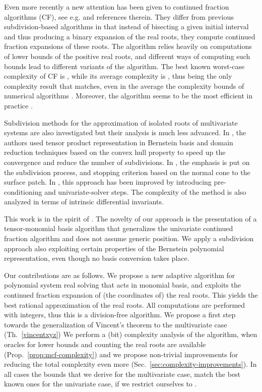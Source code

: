 \documentclass{sig-alternate}
\begin{document}
Even more recently a new attention has been given to continued
fraction algorithms (CF), see
e.g. \cite{sharma-tcs-2008,et-tcs-2007} and references
therein. They differ from previous subdivision-based algorithms in
that instead of bisecting a given initial interval and thus producing
a binary expansion of the real roots, they compute continued fraction
expansions of these roots. The algorithm relies heavily on
computations of lower bounds of the positive real roots, and different
ways of computing such bounds lead to different variants of the
algorithm.  The best known worst-case complexity of CF is  \cite{sharma-tcs-2008}, while its average complexity is
, thus being the only complexity result that matches,
even in the average the complexity bounds of numerical algorithms
\cite{Pan02jsc}.  Moreover, the algorithm seems to be the most
efficient in practice \cite{ACS-TR-363602-02,et-tcs-2007}.


Subdivision methods for the approximation of isolated roots of
multivariate systems are also investigated but their analysis is much
less advanced.  In \cite{sp-csnps-93}, the authors used tensor product
representation in Bernstein basis and domain reduction techniques
based on the convex hull property to speed up the convergence and
reduce the number of subdivisions. In \cite{ELBER:2001}, the emphasis
is put on the subdivision process, and stopping criterion based on the
normal cone to the surface patch.  In \cite{mp:smspe-05}, this
approach has been improved by introducing pre-conditioning and
univariate-solver steps. The complexity of the method is also analyzed
in terms of intrinsic differential invariants.

This work is in the spirit of \cite{mp:smspe-05}.  The novelty of our
approach is the presentation of a tensor-monomial basis algorithm that
generalizes the univariate continued fraction algorithm and does not
assume generic position. We apply a subdivision approach also
exploiting certain properties of the Bernstein polynomial
representation, even though no basis conversion takes place.



Our contributions are as follows.
We propose a new adaptive algorithm for polynomial system real solving
that acts in monomial basis, and exploits the continued fraction
expansion of (the coordinates of) the real roots.  This yields the
best rational approximation of the real roots.  All computations are
performed with integers, thus this is a division-free algorithm.
We propose a first step towards the generalization of Vincent's
theorem to the multivariate case (Th.~\ref{vincentxyz})
We perform a (bit) complexity analysis of the algorithm, when oracles
for lower bounds and counting the real roots are available
(Prop.~\ref{prop:mcf-complexity}) and we propose non-trivial
improvements for reducing the total complexity even more
(Sec.~\ref{sec:complexity-improvements}).  In all cases the bounds
that we derive for the multivariate case, match the best known ones
for the univariate case, if we restrict ourselves to .
\end{document}
